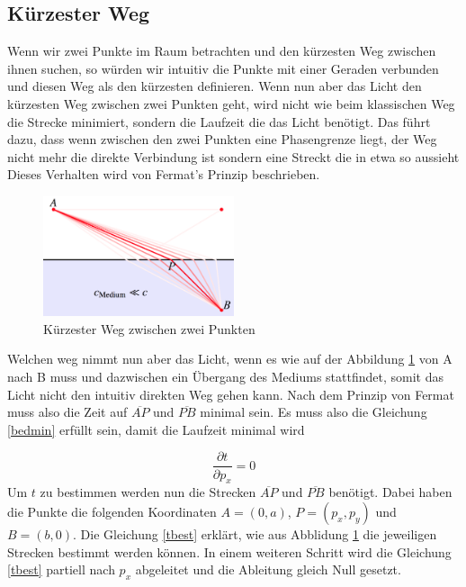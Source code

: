 \begin{refsection}
\section{Kürzester Weg}
Wenn wir zwei Punkte im Raum betrachten und den kürzesten Weg zwischen ihnen suchen, so würden wir intuitiv die Punkte mit einer Geraden verbunden und diesen Weg als den kürzesten definieren. Wenn nun aber das Licht den kürzesten Weg zwischen zwei Punkten geht, wird nicht wie beim klassischen Weg die Strecke minimiert, sondern die Laufzeit die das Licht benötigt. Das führt dazu, dass wenn zwischen den zwei Punkten eine Phasengrenze liegt, der Weg nicht mehr die direkte Verbindung ist sondern eine Streckt die in etwa so aussieht Dieses Verhalten wird von Fermat's Prinzip beschrieben.

\begin{figure}
  \centering
  \includegraphics[width=0.5\textwidth]{adaptiv/images/Weg}
  \caption{Kürzester Weg zwischen zwei Punkten}
  \label{fig:weg}
\end{figure}

Welchen weg nimmt nun aber das Licht, wenn es wie auf der Abbildung \ref{fig:weg} von A nach B muss und dazwischen ein Übergang des Mediums stattfindet, somit das Licht nicht den intuitiv direkten Weg gehen kann. Nach dem Prinzip von Fermat muss also die Zeit auf $\overline{AP}$ und $\overline{PB}$ minimal sein. Es muss also die Gleichung \eqref{bedmin} erfüllt sein, damit die Laufzeit minimal wird

\begin{equation}\label{bedmin}
\dfrac{\partial t}{\partial p_{x}}=0
\end{equation}
Um $t$ zu bestimmen werden nun die Strecken $\overline{AP}$ und $\overline{PB}$ benötigt. Dabei haben die Punkte die folgenden Koordinaten $A = (0,a)$, $P=(p_{x},p_{y})$ und $B=(b,0)$. Die Gleichung \eqref{tbest} erklärt, wie aus Abblidung \ref{fig:weg} die jeweiligen Strecken bestimmt werden können. In einem weiteren Schritt wird die Gleichung \eqref{tbest} partiell nach $p_{x}$ abgeleitet und die Ableitung gleich Null gesetzt.


\end{refsection}
